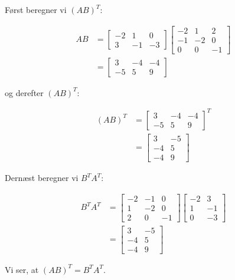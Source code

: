 \begin{solution}
    Først beregner vi $(AB)^T$:

    \[
    \begin{aligned}
    A B &=\left[\begin{array}{rrr}
    -2 & 1 & 0 \\
    3 & -1 & -3
    \end{array}\right]\left[\begin{array}{rrr}
    -2 & 1 & 2 \\
    -1 & -2 & 0 \\
    0 & 0 & -1
    \end{array}\right] \\
    &=\left[\begin{array}{rrr}
        3 & -4 & -4 \\
        -5 & 5 & 9
        \end{array}\right]
    \end{aligned}
    \]

    og derefter $(AB)^T$:

    \[
    \begin{aligned}
    (A B)^{T} &=\left[\begin{array}{rrr}
        3 & -4 & -4 \\
        -5 & 5 & 9
        \end{array}\right]^{T} \\
    &=\left[\begin{array}{rr}
        3 & -5 \\
        -4 & 5 \\
        -4 & 9
        \end{array}\right]
    \end{aligned}
    \]

    Dernæst beregner vi $B^T A^T$:

    \[
    \begin{aligned}
    B^{T} A^{T} &=\left[\begin{array}{rrr}
        -2 & -1 & 0 \\
        1 & -2 & 0 \\
        2 & 0 & -1
        \end{array}\right]\left[\begin{array}{rr}
        -2 & 3 \\
        1 & -1 \\
        0 & -3
        \end{array}\right] \\
    &=\left[\begin{array}{rr}
    3 & -5 \\
    -4 & 5 \\
    -4 & 9
    \end{array}\right]
    \end{aligned}
    \]

    Vi ser, at $(AB)^T = B^T A^T$. \end{solution}

